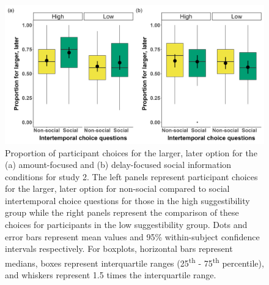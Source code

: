 \documentclass[
  doc,floatsintext]{apa6}
\begin{document}
\begin{figure}

{\centering \includegraphics[width=1\linewidth]{figures/suggestibility_itc_2} 

}

\caption{Proportion of participant choices for the larger, later option for the (a) amount-focused and (b) delay-focused social information conditions for study 2. The left panels represent participant choices for the larger, later option for non-social compared to social intertemporal choice questions for those in the high suggestibility group while the right panels represent the comparison of these choices for participants in the low suggestibility group. Dots and error bars represent mean values and 95\% within-subject confidence intervals respectively. For boxplots, horizontal bars represent medians, boxes represent interquartile ranges (25\textsuperscript{th} - 75\textsuperscript{th} percentile), and whiskers represent 1.5 times the interquartile range.}\label{fig:suggestibility2}
\end{figure}
\end{document}
